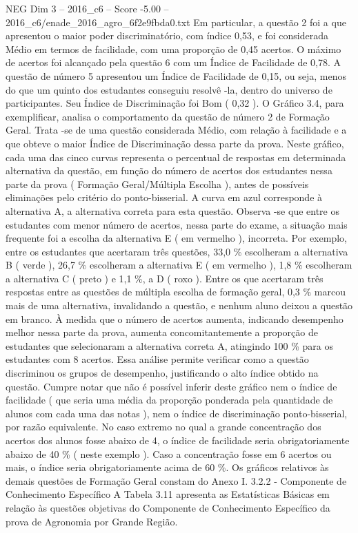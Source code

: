 \begin{textsample}{NEG Dim 3 – 2016\_c6 – Score -5.00 – 2016\_c6/enade\_2016\_agro\_6f2e9fbda0.txt}
Em particular, a questão 2 foi a que apresentou o maior poder discriminatório, com índice 0,53, e foi considerada Médio em termos de facilidade, com uma proporção de 0,45 acertos.
O máximo de acertos foi alcançado pela questão 6 com um Índice de Facilidade de 0,78.
A questão de número 5 apresentou um Índice de Facilidade de 0,15, ou seja, menos do que um quinto dos estudantes conseguiu resolvê -la, dentro do universo de participantes.
Seu Índice de Discriminação foi Bom ( 0,32 ).
O Gráfico 3.4, para exemplificar, analisa o comportamento da questão de número 2 de Formação Geral.
Trata -se de uma questão considerada Médio, com relação à facilidade e a que obteve o maior Índice de Discriminação dessa parte da prova.
Neste gráfico, cada uma das cinco curvas representa o percentual de respostas em determinada alternativa da questão, em função do número de acertos dos estudantes nessa parte da prova ( Formação Geral/Múltipla Escolha ), antes de possíveis eliminações pelo critério do ponto-bisserial.
A curva em azul corresponde à alternativa A, a alternativa correta para esta questão.
Observa -se que entre os estudantes com menor número de acertos, nessa parte do exame, a situação mais frequente foi a escolha da alternativa E ( em vermelho ), incorreta.
Por exemplo, entre os estudantes que acertaram três questões, 33,0 \% escolheram a alternativa B ( verde ), 26,7 \% escolheram a alternativa E ( em vermelho ), 1,8 \% escolheram a alternativa C ( preto ) e 1,1 \%, a D ( roxo ).
Entre os que acertaram três respostas entre as questões de múltipla escolha de formação geral, 0,3 \% marcou mais de uma alternativa, invalidando a questão, e nenhum aluno deixou a questão em branco.
À medida que o número de acertos aumenta, indicando desempenho melhor nessa parte da prova, aumenta concomitantemente a proporção de estudantes que selecionaram a alternativa correta A, atingindo 100 \% para os estudantes com 8 acertos.
Essa análise permite verificar como a questão discriminou os grupos de desempenho, justificando o alto índice obtido na questão.
Cumpre notar que não é possível inferir deste gráfico nem o índice de facilidade ( que seria uma média da proporção ponderada pela quantidade de alunos com cada uma das notas ), nem o índice de discriminação ponto-bisserial, por razão equivalente.
No caso extremo no qual a grande concentração dos acertos dos alunos fosse abaixo de 4, o índice de facilidade seria obrigatoriamente abaixo de 40 \% ( neste exemplo ).
Caso a concentração fosse em 6 acertos ou mais, o índice seria obrigatoriamente acima de 60 \%.
Os gráficos relativos às demais questões de Formação Geral constam do Anexo I. 3.2.2 - Componente de Conhecimento Específico A Tabela 3.11 apresenta as Estatísticas Básicas em relação às questões objetivas do Componente de Conhecimento Específico da prova de Agronomia por Grande Região.

\end{textsample}
